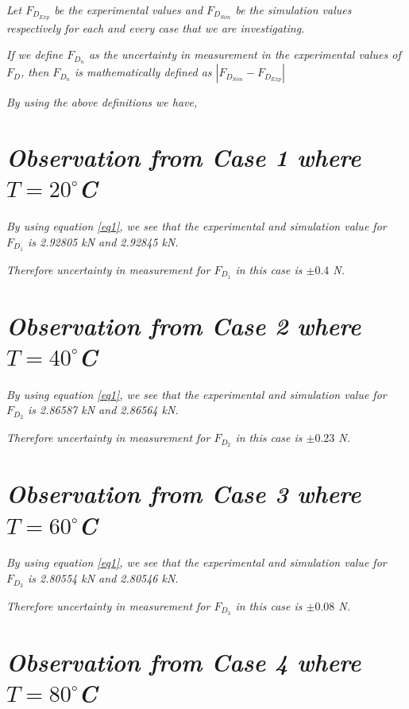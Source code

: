 \textit{Let $F_{{D}_{Exp}}$ be the experimental values and $F_{{D}_{Sim}}$ be the simulation values respectively for each and every case that we are investigating.} 

\textit{If we define $F_{D_n}$ as the uncertainty in measurement in the experimental values of $F_D$, then $F_{D_n}$ is mathematically defined as $\left| F_{{D}_{Sim}} - F_{{D}_{Exp}} \right|$}

\textit{By using the above definitions we have,}

\section{\textit{Observation from Case 1 where $T = 20^\circ$C}}

	\textit{By using equation \ref{eq1}, we see that the experimental and simulation value for $F_{D_1}$ is 2.92805 kN and 2.92845 kN.}
        
	\textit{Therefore uncertainty in measurement for $F_{D_1}$ in this case is $\pm{\textit{0.4}}$ N.}        
        
\section{\textit{Observation from Case 2 where $T = 40^\circ$C}}
        
	\textit{By using equation \ref{eq1}, we see that the experimental and simulation value for $F_{D_2}$ is 2.86587 kN and 2.86564 kN.}
        
	\textit{Therefore uncertainty in measurement for $F_{D_2}$ in this case is $\pm{\textit{0.23}}$ N.}       
        
\section{\textit{Observation from Case 3 where $T = 60^\circ$C}}
        
	\textit{By using equation \ref{eq1}, we see that the experimental and simulation value for $F_{D_3}$ is 2.80554 kN and 2.80546 kN.}
        
	\textit{Therefore uncertainty in measurement for $F_{D_3}$ in this case is $\pm{\textit{0.08}}$ N.}
        
\section{\textit{Observation from Case 4 where $T = 80^\circ$C}}
        
